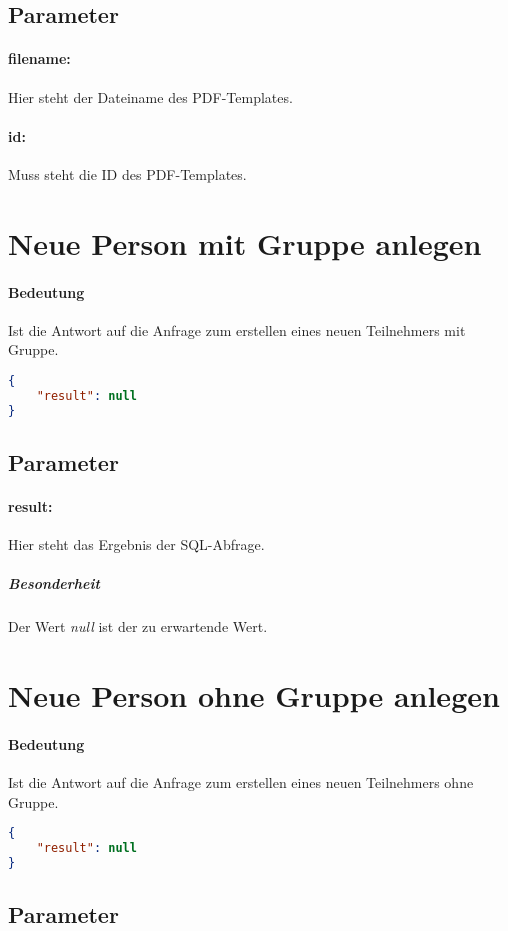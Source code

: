 \documentclass[12pt,parskip=full, pagea4]{scrreprt}
\begin{document}
			\subsection{Parameter}
			\paragraph{filename:}Hier steht der Dateiname des PDF-Templates.
			\paragraph{id:}Muss steht die ID des PDF-Templates.
			
			\section{Neue Person mit Gruppe anlegen}
			\paragraph{Bedeutung} Ist die Antwort auf die Anfrage zum erstellen eines neuen Teilnehmers mit Gruppe.
			\begin{lstlisting}[language=JSON]
{
	"result": null
}
			\end{lstlisting}
			\subsection{Parameter}
			\paragraph{result:}Hier steht das Ergebnis der SQL-Abfrage.
			\subparagraph{Besonderheit} \leftskip=1.5cm Der Wert \textit{null} ist der zu erwartende Wert.
			
			\leftskip=0cm
			
			\section{Neue Person ohne Gruppe anlegen}
			\paragraph{Bedeutung} Ist die Antwort auf die Anfrage zum erstellen eines neuen Teilnehmers ohne Gruppe.
			\begin{lstlisting}[language=JSON]
{
	"result": null
}
			\end{lstlisting}
			\subsection{Parameter}
\end{document}
